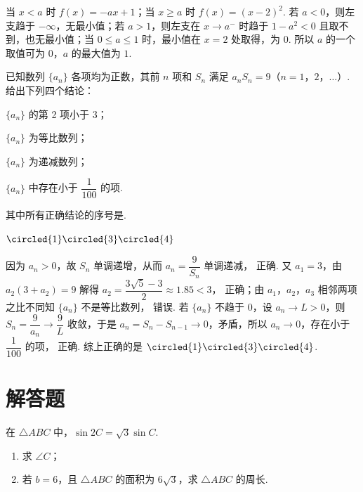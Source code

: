 \begin{solution}
当 \(x<a\) 时 \(f(x)=-ax+1\)；当 \(x\ge a\) 时 \(f(x)=(x-2)^2\). 若 \(a<0\)，则左支趋于 \(-\infty\)，无最小值；若 \(a>1\)，则左支在 \(x\to a^-\) 时趋于 \(1-a^2<0\) 且取不到，也无最小值；当 \(0\le a\le1\) 时，最小值在 \(x=2\) 处取得，为 \(0\). 所以 \(a\) 的一个取值可为 \(0\)，\(a\) 的最大值为 \(1\).
\end{solution}

\begin{problem}
已知数列 \(\{a_n\}\) 各项均为正数，其前 \(n\) 项和 \(S_n\) 满足 \(a_nS_n=9\)（\(n=1\)，\(2\)，\(\dots\)）. 给出下列四个结论：

\begin{circlelist}
\item \(\{a_n\}\) 的第 2 项小于 3；

\item \(\{a_n\}\) 为等比数列；

\item \(\{a_n\}\) 为递减数列；

\item \(\{a_n\}\) 中存在小于 \(\dfrac{1}{100}\) 的项.
\end{circlelist}

其中所有正确结论的序号是\fillinblank{}.
\end{problem}

\begin{answer}
\(\circled{1}\circled{3}\circled{4}\)
\end{answer}

\begin{solution}
因为 \(a_n>0\)，故 \(S_n\) 单调递增，从而 \(a_n=\dfrac9{S_n}\) 单调递减， 正确. 又 \(a_1=3\)，由 \(a_2(3+a_2)=9\) 解得 \(a_2=\dfrac{3\sqrt5-3}{2}\approx1.85<3\)， 正确；由 \(a_1\)，\(a_2\)，\(a_3\) 相邻两项之比不同知 \(\{a_n\}\) 不是等比数列， 错误. 若 \(\{a_n\}\) 不趋于 \(0\)，设 \(a_n\to L>0\)，则 \(S_n=\dfrac9{a_n}\to\dfrac9L\) 收敛，于是 \(a_n=S_n-S_{n-1}\to0\)，矛盾，所以 \(a_n\to0\)，存在小于 \(\dfrac1{100}\) 的项， 正确. 综上正确的是 \(\circled{1}\circled{3}\circled{4}\).
\end{solution}

\section{解答题}

\begin{problem}
在 \(\triangle ABC\) 中，\(\sin 2C=\sqrt3\sin C\).

\begin{enumerate}
\item 求 \(\angle C\)；

\item 若 \(b=6\)，且 \(\triangle ABC\) 的面积为 \(6\sqrt3\)，求 \(\triangle ABC\) 的周长.
\end{enumerate}
\end{problem}

